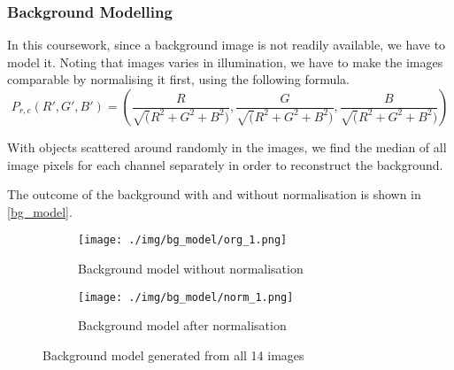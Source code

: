 \documentclass[main.tex]{subfiles}
\begin{document}
\subsubsection*{Background Modelling}
In this coursework, since a background image is not readily available, we have to model it. Noting that images varies in illumination, we have to make the images comparable by normalising it first, using the following formula.
$$ P_{r,c}(R',G',B')=(\frac{R}{\sqrt(R^2+G^2+B^2)},\frac{G}{\sqrt(R^2+G^2+B^2)},\frac{B}{\sqrt(R^2+G^2+B^2)})$$

With objects scattered around randomly in the images, we find the median of all image pixels for each channel separately in order to reconstruct the background.

The outcome of the background with and without normalisation is shown in \autoref{bg_model}.

\begin{figure}[!h]
  \centering
  \begin{subfigure}[b]{.45\textwidth}
    \centering
    \texttt{[image: ./img/bg\_model/org\_1.png]}
    \caption{Background model without normalisation}
  \end{subfigure}
  \begin{subfigure}[b]{.45\textwidth}
    \centering
    \texttt{[image: ./img/bg\_model/norm\_1.png]}
    \caption{Background model after normalisation}
  \end{subfigure}
  \caption{Background model generated from all 14 images}
  \label{bg_model}
\end{figure}
\end{document}
